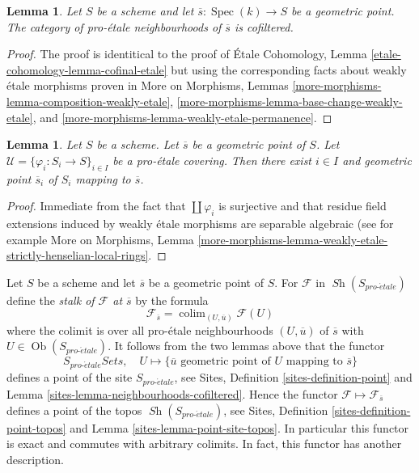 \documentclass{stacks-project}
\theoremstyle{plain}
\newtheorem{lemma}[subsection]{Lemma}
\theoremstyle{definition}
\theoremstyle{remark}
\numberwithin{equation}{subsection}
\def\colim{\mathop{\mathrm{colim}}\nolimits}
\def\Spec{\mathop{\mathrm{Spec}}}
\def\Ob{\mathop{\mathrm{Ob}}\nolimits}
\def\Sh{\mathop{\mathit{Sh}}\nolimits}
\def\proetale{{pro\text{-}\acute{e}tale}}
\begin{document}
\begin{lemma}
\label{lemma-cofinal-etale}
Let $S$ be a scheme and let $\overline{s} : \Spec(k) \to S$ be a
geometric point. The category of pro-\'etale neighbourhoods of
$\overline{s}$ is cofiltered.
\end{lemma}

\begin{proof}
The proof is identitical to the proof of
\'Etale Cohomology, Lemma \ref{etale-cohomology-lemma-cofinal-etale}
but using the corresponding facts about weakly \'etale morphisms
proven in
More on Morphisms, Lemmas
\ref{more-morphisms-lemma-composition-weakly-etale},
\ref{more-morphisms-lemma-base-change-weakly-etale}, and
\ref{more-morphisms-lemma-weakly-etale-permanence}.
\end{proof}

\begin{lemma}
\label{lemma-geometric-lift-to-cover}
Let $S$ be a scheme. Let $\overline{s}$ be a geometric point of $S$.
Let $\mathcal{U} = \{\varphi_i : S_i \to S\}_{i\in I}$ be a
pro-\'etale covering. Then there exist $i \in I$ and geometric
point $\overline{s}_i$ of $S_i$ mapping to $\overline{s}$.
\end{lemma}

\begin{proof}
Immediate from the fact that $\coprod \varphi_i$ is surjective
and that residue field extensions induced by weakly \'etale
morphisms are separable algebraic (see for example
More on Morphisms, Lemma
\ref{more-morphisms-lemma-weakly-etale-strictly-henselian-local-rings}.
\end{proof}

\noindent
Let $S$ be a scheme and let $\overline{s}$ be a geometric point of $S$.
For $\mathcal{F}$ in $\Sh(S_\proetale)$ define the
{\it stalk of $\mathcal{F}$ at $\overline{s}$} by the formula
$$
\mathcal{F}_{\overline{s}} = \colim_{(U, \overline{u})} \mathcal{F}(U)
$$
where the colimit is over all pro-\'etale neighbourhoods $(U, \overline{u})$
of $\overline{s}$ with $U \in \Ob(S_\proetale)$. It follows from the
two lemmas above that the functor
$$
S_\proetale \textit{Sets},\quad
U \longmapsto
\{\overline{u}\text{ geometric point of }U\text{ mapping to }\overline{s}\}
$$
defines a point of the site $S_\proetale$, see
Sites, Definition \ref{sites-definition-point} and
Lemma \ref{sites-lemma-neighbourhoods-cofiltered}.
Hence the functor $\mathcal{F} \mapsto \mathcal{F}_{\overline{s}}$
defines a point of the topos $\Sh(S_\proetale)$, see
Sites, Definition \ref{sites-definition-point-topos} and
Lemma \ref{sites-lemma-point-site-topos}. In particular this
functor is exact and commutes with arbitrary colimits.
In fact, this functor has another description.
\end{document}
